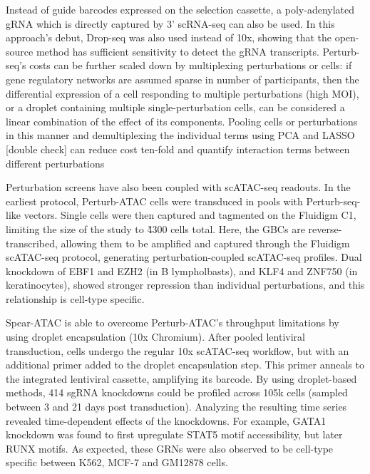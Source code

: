 
Instead of guide barcodes expressed on the selection cassette, a poly-adenylated gRNA which is directly captured by 3' scRNA-seq can also be used. In this approach's debut, Drop-seq was also used instead of 10x, showing that the open-source method has sufficient sensitivity to detect the gRNA transcripts. Perturb-seq's costs can be further scaled down by multiplexing perturbations or cells: if gene regulatory networks are assumed sparse in number of participants, then the differential expression of a cell responding to multiple perturbations (high MOI), or a droplet containing multiple single-perturbation cells, can be considered a linear combination of the effect of its components. Pooling cells or perturbations in this manner and demultiplexing the individual terms using PCA and LASSO [double check] can reduce cost ten-fold and quantify interaction terms between different perturbations

Perturbation screens have also been coupled with scATAC-seq readouts. In the earliest protocol, Perturb-ATAC cells were transduced in pools with Perturb-seq-like vectors. Single cells were then captured and tagmented on the Fluidigm C1, limiting the size of the study to \~4300 cells total. Here, the GBCs are reverse-transcribed, allowing them to be amplified and captured through the Fluidigm scATAC-seq protocol, generating perturbation-coupled scATAC-seq profiles. Dual knockdown of EBF1 and EZH2 (in B lympholbasts), and KLF4 and ZNF750 (in keratinocytes), showed stronger repression than individual perturbations, and this relationship is cell-type specific.

Spear-ATAC is able to overcome Perturb-ATAC's throughput limitations by using droplet encapsulation (10x Chromium). After pooled lentiviral transduction, cells undergo the regular 10x scATAC-seq workflow, but with an additional primer added to the droplet encapsulation step. This primer anneals to the integrated lentiviral cassette, amplifying its barcode. By using droplet-based methods, 414 sgRNA knockdowns could be profiled across 105k cells (sampled between 3 and 21 days post transduction). Analyzing the resulting time series revealed time-dependent effects of the knockdowns. For example, GATA1 knockdown was found to first upregulate STAT5 motif accessibility, but later RUNX motifs. As expected, these GRNs were also observed to be cell-type specific between K562, MCF-7 and GM12878 cells.

